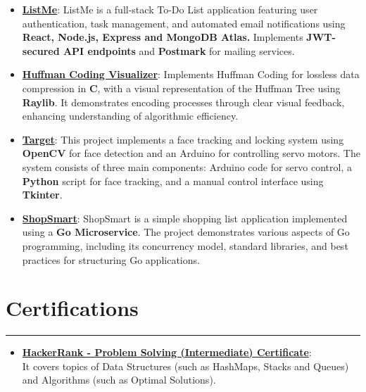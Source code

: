 \documentclass[a4paper,10pt]{article}
\begin{document}
\begin{itemize}
    \item \textbf{\href{https://github.com/thearfa99/mern}{ListMe}}: ListMe is a full-stack To-Do List application featuring user authentication, task management, and automated email notifications using \textbf{React, Node.js, Express and MongoDB Atlas.} Implements \textbf{JWT-secured API endpoints} and \textbf{Postmark} for mailing services.
    \item \textbf{\href{https://github.com/thearfa99/huft}{Huffman Coding Visualizer}}: Implements Huffman Coding for lossless data compression in \textbf{C}, with a visual representation of the Huffman Tree using \textbf{Raylib}. It demonstrates encoding processes through clear visual feedback, enhancing understanding of algorithmic efficiency.
    \item \textbf{\href{https://github.com/thearfa99/tureet}{Target}}: This project implements a face tracking and locking system using \textbf{OpenCV} for face detection and an Arduino for controlling servo motors. The system consists of three main components: Arduino code for servo control, a \textbf{Python} script for face tracking, and a manual control interface using \textbf{Tkinter}.
    \item \textbf{\href{https://github.com/thearfa99/ShopSmart}{ShopSmart}}: ShopSmart is a simple shopping list application implemented using a \textbf{Go Microservice}. The project demonstrates various aspects of Go programming, including its concurrency model, standard libraries, and best practices for structuring Go applications.
\end{itemize}

\section*{Certifications}
\hrule
\vspace{0.5em}

\begin{itemize}
    \item \textbf{\href{https://www.hackerrank.com/certificates/0546eb7d14c4}{HackerRank - Problem Solving (Intermediate) Certificate}}:\\ It covers topics of Data Structures (such as HashMaps, Stacks and Queues) and Algorithms (such as Optimal Solutions).
\end{itemize}
\end{document}
